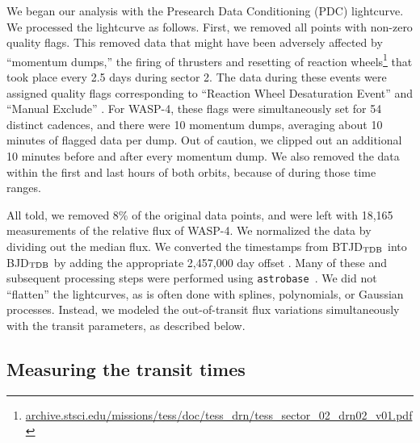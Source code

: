 \documentclass[12pt,twocolumn,tighten]{aastex62}
\begin{document}
We began our analysis with the Presearch Data Conditioning (PDC)
lightcurve.  We  processed the
lightcurve as follows.  First, we removed all points with non-zero
quality flags.  This removed data that might have been adversely
affected by ``momentum dumps,'' the firing of thrusters and resetting
of reaction wheels\footnote{\url{archive.stsci.edu/missions/tess/doc/tess_drn/tess_sector_02_drn02_v01.pdf}}
that took place every 2.5 days during sector 2.  The data during these
events were assigned quality flags corresponding to ``Reaction Wheel
Desaturation Event'' and ``Manual Exclude'' .  For WASP-4, these flags
were simultaneously set for 54 distinct cadences, and there were 10
momentum dumps, averaging about 10 minutes of flagged data per dump.
Out of caution, we clipped out an additional 10 minutes before and
after every momentum dump.  We also removed the data within the first
and last hours of both orbits, because of 
during those time ranges. 

All told, we removed 8\% of the original data points, and were left
with 18{,}165 measurements of the relative flux of WASP-4.  We
normalized the data by dividing out the median flux.  We converted the
timestamps from BTJD$_{\rm TDB}$ into BJD$_{\rm TDB}$ by adding the
appropriate 2{,}457{,}000 day offset
\citep{tess_data_product_description_2018}.  Many of these and
subsequent processing steps were performed using
\texttt{astrobase}~\citep{bhatti_astrobase_2018}. We did not
``flatten'' the lightcurves, as is often done with splines,
polynomials, or Gaussian processes.  Instead, we modeled the
out-of-transit flux variations simultaneously with the transit
parameters, as described below.

\subsection{Measuring the transit times}
\label{sec:measurement}
\end{document}
